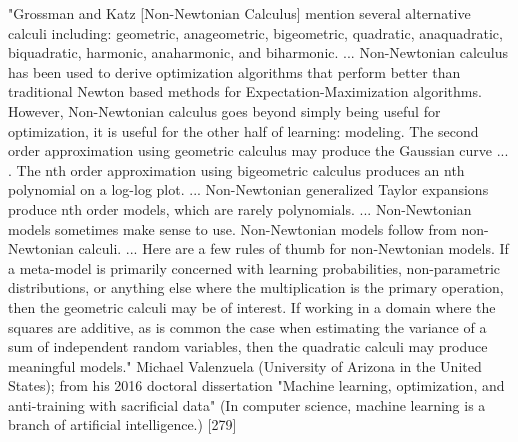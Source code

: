 \documentclass[12pt]{article}
\begin{document}
"Grossman and Katz [Non-Newtonian Calculus] mention several alternative calculi including: geometric, anageometric, bigeometric, quadratic, anaquadratic, biquadratic, harmonic, anaharmonic, and biharmonic. ... Non-Newtonian calculus has been used to derive optimization algorithms that perform better than traditional Newton based methods for Expectation-Maximization algorithms. However, Non-Newtonian calculus goes beyond simply being useful for optimization, it is useful for the other half of learning: modeling. The second order approximation using geometric calculus may produce the Gaussian curve ... . The nth order approximation using bigeometric calculus produces an nth polynomial on a log-log plot. ... Non-Newtonian generalized Taylor expansions produce nth order models, which are rarely polynomials. ... Non-Newtonian models sometimes make sense to use. Non-Newtonian models follow from non- Newtonian calculi. ... Here are a few rules of thumb for non-Newtonian models. If a meta-model is primarily concerned with learning probabilities, non-parametric distributions, or anything else where the multiplication is the primary operation, then the geometric calculi may be of interest. If working in a domain where the squares are additive, as is common the case when estimating the variance of a sum of independent random variables, then the quadratic calculi may produce meaningful models."
Michael Valenzuela (University of Arizona in the United States); from his 2016 doctoral dissertation "Machine learning, optimization, and anti-training with sacrificial data" (In computer science, machine learning is a branch of artificial intelligence.) [279]
\end{document}
